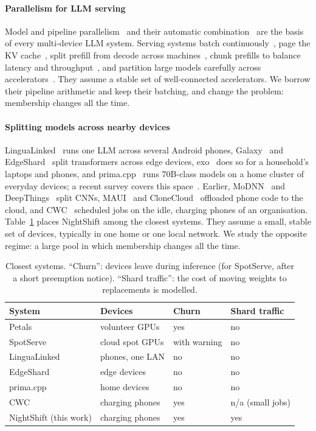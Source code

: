 \documentclass[preprint,review,12pt,authoryear]{elsarticle}
\begin{document}
\paragraph{Parallelism for LLM serving}
Model and pipeline parallelism~\citep{megatron,gpipe,pipedream} and their
automatic combination~\citep{alpa} are the basis of every multi-device LLM
system. Serving systems batch continuously~\citep{orca}, page the KV
cache~\citep{vllm}, split prefill from decode across
machines~\citep{splitwise,distserve}, chunk prefills to balance latency and
throughput~\citep{sarathi}, and partition large models carefully across
accelerators~\citep{pope2023,dsinference}. They assume a stable set of
well-connected accelerators. We borrow their pipeline arithmetic and keep
their batching, and change the problem: membership changes all the time.

\paragraph{Splitting models across nearby devices}
LinguaLinked~\citep{lingualinked} runs one LLM across several Android phones,
Galaxy~\citep{galaxy} and EdgeShard~\citep{edgeshard} split transformers across
edge devices, exo~\citep{exo} does so for a household's laptops and phones, and
prima.cpp~\citep{primacpp} runs 70B-class models on a home cluster of everyday
devices; a recent survey covers this space~\citep{edgellmsurvey}. Earlier,
MoDNN~\citep{modnn} and DeepThings~\citep{deepthings} split CNNs,
MAUI~\citep{maui} and CloneCloud~\citep{clonecloud} offloaded phone code to the
cloud, and CWC~\citep{cwc} scheduled jobs on the idle, charging phones of an
organisation. Table~\ref{tab:compare} places NightShift among the closest
systems. They assume a small, stable set of devices, typically in one home or
one local network. We study the opposite regime: a large pool in which
membership changes all the time.

\begin{table}[t]
\caption{Closest systems. ``Churn'': devices leave during inference (for
SpotServe, after a short preemption notice). ``Shard traffic'': the cost of moving weights to replacements is
modelled.}
\label{tab:compare}
\small
\begin{tabular}{@{}llll@{}}
\toprule
System & Devices & Churn & Shard traffic\\
\midrule
Petals~\citep{petals-neurips} & volunteer GPUs & yes & no\\
SpotServe~\citep{spotserve} & cloud spot GPUs & with warning & no\\
LinguaLinked~\citep{lingualinked} & phones, one LAN & no & no\\
EdgeShard~\citep{edgeshard} & edge devices & no & no\\
prima.cpp~\citep{primacpp} & home devices & no & no\\
CWC~\citep{cwc} & charging phones & yes & n/a (small jobs)\\
NightShift (this work) & charging phones & yes & yes\\
\bottomrule
\end{tabular}
\end{table}
\end{document}
